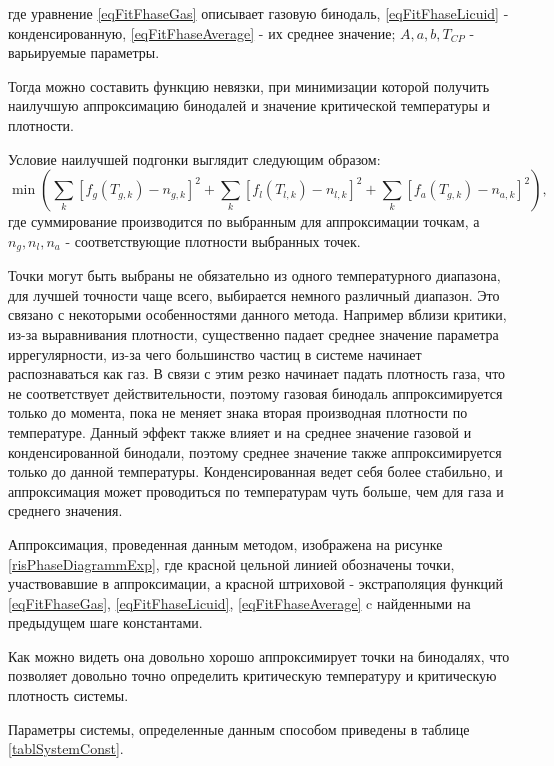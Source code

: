 где уравнение \ref{eqFitFhaseGas} описывает газовую бинодаль, \ref{eqFitFhaseLicuid} - конденсированную, \ref{eqFitFhaseAverage} - их среднее значение; $A, a, b, T_{CP}$ - варьируемые параметры. 


Тогда можно составить функцию невязки, при минимизации которой получить наилучшую аппроксимацию бинодалей и значение критической температуры и плотности.

Условие наилучшей подгонки выглядит следующим образом:
\begin{equation}
\min \left(\sum\limits_{k} \left[ f_g(T_{g, k}) - n_{g, k}  \right]^2 + \sum\limits_{k} \left[ f_l(T_{l, k}) - n_{l, k}  \right]^2 + \sum\limits_{k} \left[ f_a(T_{g, k}) - n_{a, k}  \right]^2 \right),
\label{eqFitResidual}
\end{equation}
где суммирование производится по выбранным для аппроксимации точкам, а $n_g, n_l, n_a$ - соответствующие плотности выбранных точек. 

Точки могут быть выбраны не обязательно из одного температурного диапазона, для лучшей точности чаще всего, выбирается немного различный диапазон. Это связано с некоторыми особенностями данного метода. Например вблизи критики, из-за выравнивания плотности, существенно падает среднее значение параметра иррегулярности, из-за чего большинство частиц в системе начинает распознаваться как газ. В связи с этим резко начинает падать плотность газа, что не соответствует действительности, поэтому газовая бинодаль аппроксимируется только до момента, пока не меняет знака вторая производная плотности по температуре. Данный эффект также влияет и на среднее значение газовой и конденсированной бинодали, поэтому среднее значение также аппроксимируется только до данной температуры. Конденсированная ведет себя более стабильно, и аппроксимация может проводиться по температурам чуть больше, чем для газа и среднего значения.

Аппроксимация, проведенная данным методом, изображена на рисунке \ref{risPhaseDiagrammExp}, где красной цельной линией обозначены точки, участвовавшие в аппроксимации, а красной штриховой - экстраполяция функций \ref{eqFitFhaseGas}, \ref{eqFitFhaseLicuid}, \ref{eqFitFhaseAverage} c найденными на предыдущем шаге константами.

Как можно видеть она довольно хорошо аппроксимирует точки на бинодалях, что позволяет довольно точно определить критическую температуру и критическую плотность системы.

Параметры системы, определенные данным способом приведены в таблице \ref{tablSystemConst}.

